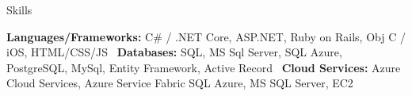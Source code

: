 \documentclass{resume} %
\begin{document}

\begin{rSection}{Skills}

\textbf{Languages/Frameworks:} C# / .NET Core, ASP.NET, Ruby on Rails, Obj C / iOS, HTML/CSS/JS \
\textbf{Databases:} SQL, MS Sql Server, SQL Azure, PostgreSQL, MySql, Entity Framework, Active Record  \
\textbf{Cloud Services:} Azure Cloud Services, Azure Service Fabric SQL Azure, MS SQL Server, EC2 \

\end{rSection}

\end{document}
